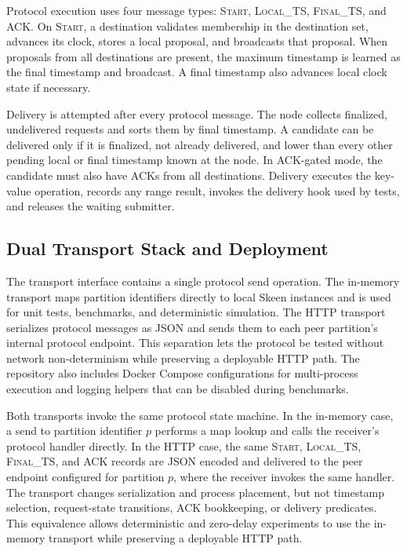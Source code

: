 \documentclass[conference]{IEEEtran}
\begin{document}
Protocol execution uses four message types: \textsc{Start}, \textsc{Local\_TS}, \textsc{Final\_TS}, and \textsc{ACK}. On \textsc{Start}, a destination validates membership in the destination set, advances its clock, stores a local proposal, and broadcasts that proposal. When proposals from all destinations are present, the maximum timestamp is learned as the final timestamp and broadcast. A final timestamp also advances local clock state if necessary.












Delivery is attempted after every protocol message. The node collects finalized, undelivered requests and sorts them by final timestamp. A candidate can be delivered only if it is finalized, not already delivered, and lower than every other pending local or final timestamp known at the node. In ACK-gated mode, the candidate must also have ACKs from all destinations. Delivery executes the key-value operation, records any range result, invokes the delivery hook used by tests, and releases the waiting submitter.

\subsection{Dual Transport Stack and Deployment}

The transport interface contains a single protocol send operation. The in-memory transport maps partition identifiers directly to local Skeen instances and is used for unit tests, benchmarks, and deterministic simulation. The HTTP transport serializes protocol messages as JSON and sends them to each peer partition's internal protocol endpoint. This separation lets the protocol be tested without network non-determinism while preserving a deployable HTTP path. The repository also includes Docker Compose configurations for multi-process execution and logging helpers that can be disabled during benchmarks.

Both transports invoke the same protocol state machine. In the in-memory case, a send to partition identifier $p$ performs a map lookup and calls the receiver's protocol handler directly. In the HTTP case, the same \textsc{Start}, \textsc{Local\_TS}, \textsc{Final\_TS}, and \textsc{ACK} records are JSON encoded and delivered to the peer endpoint configured for partition $p$, where the receiver invokes the same handler. The transport changes serialization and process placement, but not timestamp selection, request-state transitions, ACK bookkeeping, or delivery predicates. This equivalence allows deterministic and zero-delay experiments to use the in-memory transport while preserving a deployable HTTP path.
\end{document}
